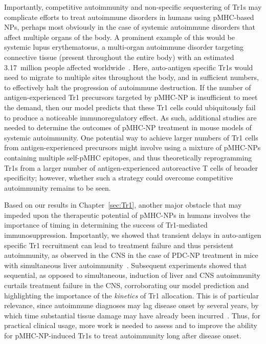 Importantly, competitive autoimmunity and non-specific sequestering of Tr1s may complicate efforts to treat autoimmune disorders in humans using pMHC-based NPs, perhaps most obviously in the case of systemic autoimmune disorders that affect multiple organs of the body. A prominent example of this would be systemic lupus erythematosus, a multi-organ autoimmune disorder targeting connective tissue (present throughout the entire body) with an estimated 3.17~million people affected worldwide~\cite{fatoye2022global,tian2023global}. Here, auto-antigen specific Tr1s would need to migrate to multiple sites throughout the body, and in sufficient numbers, to effectively halt the progression of autoimmune destruction. If the number of antigen-experienced Tr1 precursors targeted by pMHC-NP is insufficient to meet the demand, then our model predicts that these Tr1 cells could ubiquitously fail to produce a noticeable immunoregulatory effect. As such, additional studies are needed to determine the outcomes of pMHC-NP treatment in mouse models of systemic autoimmunity. One potential way to achieve larger numbers of Tr1 cells from antigen-experienced precursors might involve using a mixture of pMHC-NPs containing multiple self-pMHC epitopes, and thus theoretically reprogramming Tr1s from a larger number of antigen-experienced autoreactive T cells of broader specificity; however, whether such a strategy could overcome competitive autoimmunity remains to be seen. 

Based on our results in Chapter~\ref{sec:Tr1}, another major obstacle that may impeded upon the therapeutic potential of pMHC-NPs in humans involves the importance of timing in determining the success of Tr1-mediated immunosuppression. Importantly, we showed that transient delays in auto-antigen specific Tr1 recruitment can lead to treatment failure and thus persistent autoimmunity, as observed in the CNS in the case of PDC-NP treatment in mice with simultaneous liver autoimmunity~\cite{umeshappa2020ubiquitous}. Subsequent experiments showed that sequential, as opposed to simultaneous, induction of liver and CNS autoimmunity curtails treatment failure in the CNS, corroborating our model prediction and highlighting the importance of the \textit{kinetics} of Tr1 allocation. This is of particular relevance, since autoimmune diagnoses may lag disease onset by several years, by which time substantial tissue damage may have already been incurred~\cite{rose2016prediction}. Thus, for practical clinical usage, more work is needed to assess and to improve the ability for pMHC-NP-induced Tr1s to treat autoimmunity long after disease onset. 


